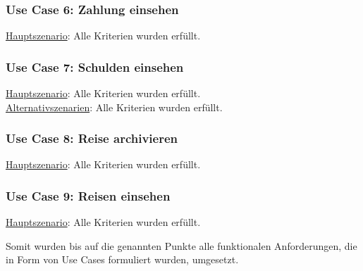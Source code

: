\subsubsection*{Use Case 6: Zahlung einsehen}

\begin{addmargin}{10pt}
\underline{Hauptszenario}: Alle Kriterien wurden erfüllt.\\
\end{addmargin}

\subsubsection*{Use Case 7: Schulden einsehen}

\begin{addmargin}{10pt}
\underline{Hauptszenario}: Alle Kriterien wurden erfüllt.\\
\underline{Alternativszenarien}: Alle Kriterien wurden erfüllt.\\
\end{addmargin}

\subsubsection*{Use Case 8: Reise archivieren}

\begin{addmargin}{10pt}
\underline{Hauptszenario}: Alle Kriterien wurden erfüllt.\\
\end{addmargin}
\subsubsection*{Use Case 9: Reisen einsehen}

\begin{addmargin}{10pt}
\underline{Hauptszenario}: Alle Kriterien wurden erfüllt.
\end{addmargin}

Somit wurden bis auf die genannten Punkte alle funktionalen Anforderungen, 
die in Form von Use Cases formuliert wurden, umgesetzt.






